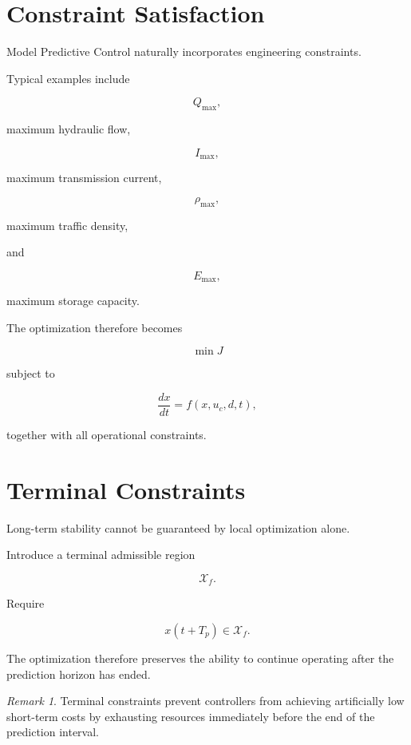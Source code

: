 \documentclass[11pt,fleqn]{book}
\numberwithin{equation}{chapter}
\theoremstyle{plain}
\theoremstyle{definition}
\theoremstyle{remark}
\newtheorem{remark}[theorem]{Remark}
\begin{document}

\section{Constraint Satisfaction}

Model Predictive Control naturally incorporates engineering constraints.

Typical examples include

\[
Q_{\max},
\]

maximum hydraulic flow,

\[
I_{\max},
\]

maximum transmission current,

\[
\rho_{\max},
\]

maximum traffic density,

and

\[
E_{\max},
\]

maximum storage capacity.

The optimization therefore becomes

\[
\min
J
\]

subject to

\[
\frac{dx}{dt}
=
f(x,u_c,d,t),
\]

together with all operational constraints.


\section{Terminal Constraints}

Long-term stability cannot be guaranteed by local optimization alone.

Introduce a terminal admissible region

\[
\mathcal X_f.
\]

Require

\[
x(t+T_p)
\in
\mathcal X_f.
\]

The optimization therefore preserves the ability to continue operating
after the prediction horizon has ended.


\begin{remark}

Terminal constraints prevent controllers from achieving artificially low
short-term costs by exhausting resources immediately before the end of
the prediction interval.

\end{remark}
\end{document}
